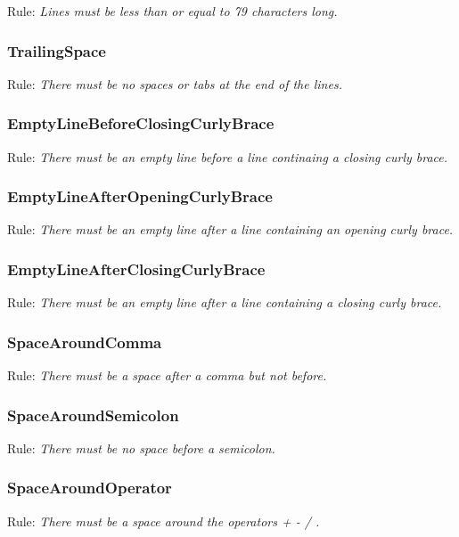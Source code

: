 Rule:
\emph{Lines must be less than or equal to 79 characters long.}

\subsubsection{TrailingSpace}

Rule:
\emph{There must be no spaces or tabs at the end of the lines.}

\subsubsection{EmptyLineBeforeClosingCurlyBrace}

Rule:
\emph{There must be an empty line before a line continaing a closing curly brace.}

\subsubsection{EmptyLineAfterOpeningCurlyBrace}

Rule:
\emph{There must be an empty line after a line containing an opening curly brace.}

\subsubsection{EmptyLineAfterClosingCurlyBrace}

Rule:
\emph{There must be an empty line after a line containing a closing curly brace.}

\subsubsection{SpaceAroundComma}

Rule:
\emph{There must be a space after a comma but not before.}

\subsubsection{SpaceAroundSemicolon}

Rule:
\emph{There must be no space before a semicolon.}

\subsubsection{SpaceAroundOperator}

Rule:
\emph{There must be a space around the operators + - / \textbar .}

